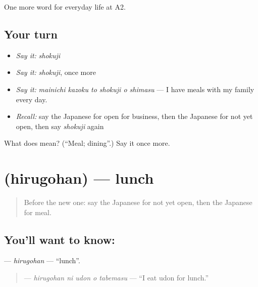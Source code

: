 \begin{grammarlens}[title={What you've built}]
One more word for everyday life at A2.
\end{grammarlens}

\subsection*{Your turn}
\begin{itemize}
\raggedright
  \item \emph{Say it:} \emph{shokuji}
  \item \emph{Say it:} \emph{shokuji}, once more
  \item \emph{Say it:} \emph{mainichi kazoku to shokuji o shimasu} — I have meals with my family every day.
  \item \emph{Recall:} say the Japanese for open for business, then the Japanese for not yet open, then say \emph{shokuji} again
\end{itemize}

\begin{tcolorbox}[breakable,colback=teal!4,colframe=teal!35!black,title={Before you move on}]
What does  mean? (\textquotedblleft{}Meal; dining\textquotedblright{}.) Say it once more.
\end{tcolorbox}
\section[\texorpdfstring{\ja{ひるごはん} (hirugohan)}{ひるごはん (hirugohan)}]{ (hirugohan) — lunch}

\label{lesson:JA-C172-hirugohan}



\begin{quote}
Before the new one: say the Japanese for not yet open, then the Japanese for meal.
\end{quote}

\subsection*{You'll want to know: }
\textbf{} — \emph{hirugohan} — \textquotedblleft{}lunch\textquotedblright{}.

\begin{quote}
\textbf{  } — \emph{hirugohan ni udon o tabemasu} — \textquotedblleft{}I eat udon for lunch.\textquotedblright{}
\end{quote}

